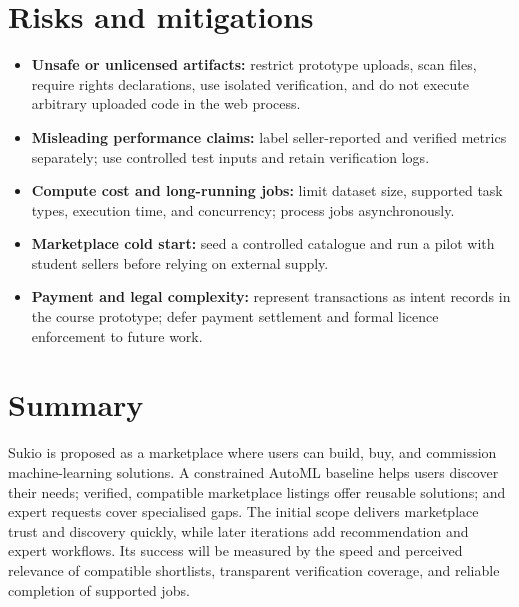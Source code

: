 \documentclass[11pt,a4paper]{article}
\begin{document}
\section{Risks and mitigations}
\begin{itemize}[leftmargin=0.7cm]
  \item \textbf{Unsafe or unlicensed artifacts:} restrict prototype uploads, scan files, require rights declarations, use isolated verification, and do not execute arbitrary uploaded code in the web process.
  \item \textbf{Misleading performance claims:} label seller-reported and verified metrics separately; use controlled test inputs and retain verification logs.
  \item \textbf{Compute cost and long-running jobs:} limit dataset size, supported task types, execution time, and concurrency; process jobs asynchronously.
  \item \textbf{Marketplace cold start:} seed a controlled catalogue and run a pilot with student sellers before relying on external supply.
  \item \textbf{Payment and legal complexity:} represent transactions as intent records in the course prototype; defer payment settlement and formal licence enforcement to future work.
\end{itemize}

\section{Summary}
Sukio is proposed as a marketplace where users can build, buy, and commission machine-learning solutions. A constrained AutoML baseline helps users discover their needs; verified, compatible marketplace listings offer reusable solutions; and expert requests cover specialised gaps. The initial scope delivers marketplace trust and discovery quickly, while later iterations add recommendation and expert workflows. Its success will be measured by the speed and perceived relevance of compatible shortlists, transparent verification coverage, and reliable completion of supported jobs.
\end{document}
